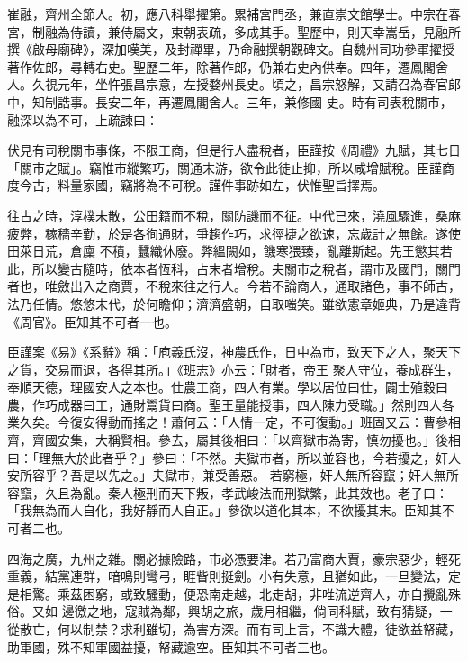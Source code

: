 \begin{pinyinscope}
 崔融，齊州全節人。初，應八科舉擢第。累補宮門丞，兼直崇文館學士。中宗在春宮，制融為侍讀，兼侍屬文，東朝表疏，多成其手。聖歷中，則天幸嵩岳，見融所撰《啟母廟碑》，深加嘆美，及封禪畢，乃命融撰朝觀碑文。自魏州司功參軍擢授著作佐郎，尋轉右史。聖歷二年，除著作郎，仍兼右史內供奉。四年，遷鳳閣舍人。久視元年，坐忤張昌宗意，左授婺州長史。頃之，昌宗怒解，又請召為春官郎中，知制誥事。長安二年，再遷鳳閣舍人。三年，兼修國
 史。時有司表稅關市，融深以為不可，上疏諫曰：



 伏見有司稅關市事條，不限工商，但是行人盡稅者，臣謹按《周禮》九賦，其七日「關市之賦」。竊惟市縱繁巧，關通末游，欲令此徒止抑，所以咸增賦稅。臣謹商度今古，料量家國，竊將為不可稅。謹件事跡如左，伏惟聖旨擇焉。



 往古之時，淳樸未散，公田籍而不稅，關防譏而不征。中代已來，澆風驟進，桑麻疲弊，稼穡辛勤，於是各徇通財，爭趨作巧，求徑捷之欲速，忘歲計之無餘。遂使田萊日荒，倉廩
 不積，蠶織休廢。弊縕闕如，饑寒猥臻，亂離斯起。先王懲其若此，所以變古隨時，依本者恆科，占末者增稅。夫關市之稅者，謂市及國門，關門者也，唯斂出入之商賈，不稅來往之行人。今若不論商人，通取諸色，事不師古，法乃任情。悠悠末代，於何瞻仰；濟濟盛朝，自取嗤笑。雖欲憲章姬典，乃是違背《周官》。臣知其不可者一也。



 臣謹案《易》《系辭》稱：「庖羲氏沒，神農氏作，日中為市，致天下之人，聚天下之貨，交易而退，各得其所。」《班志》亦云：「財者，帝王
 聚人守位，養成群生，奉順天德，理國安人之本也。仕農工商，四人有業。學以居位曰仕，闢士殖穀曰農，作巧成器曰工，通財鬻貨曰商。聖王量能授事，四人陳力受職。」然則四人各業久矣。今復安得動而搖之！蕭何云：「人情一定，不可復動。」班固又云：曹參相齊，齊國安集，大稱賢相。參去，屬其後相曰：「以齊獄市為寄，慎勿擾也。」後相曰：「理無大於此者乎？」參曰：「不然。夫獄市者，所以並容也，今若擾之，奸人安所容乎？吾是以先之。」夫獄市，兼受善惡。
 若窮極，奸人無所容竄；奸人無所容竄，久且為亂。秦人極刑而天下叛，孝武峻法而刑獄繁，此其效也。老子曰：「我無為而人自化，我好靜而人自正。」參欲以道化其本，不欲擾其末。臣知其不可者二也。



 四海之廣，九州之雜。關必據險路，市必憑要津。若乃富商大賈，豪宗惡少，輕死重義，結黨連群，喑鳴則彎弓，睚眥則挺劍。小有失意，且猶如此，一旦變法，定是相驚。乘茲困窮，或致騷動，便恐南走越，北走胡，非唯流逆齊人，亦自攪亂殊俗。又如
 邊徼之地，寇賊為鄰，興胡之旅，歲月相繼，倘同科賦，致有猜疑，一從散亡，何以制禁？求利雖切，為害方深。而有司上言，不識大體，徒欲益帑藏，助軍國，殊不知軍國益擾，帑藏逾空。臣知其不可者三也。




\end{pinyinscope}
